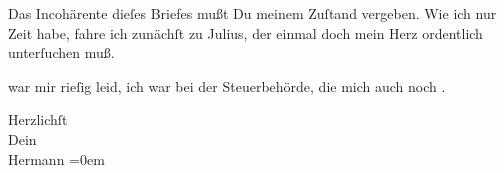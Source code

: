 \pstart
           Das Incohärente dieſes Briefes mußt Du meinem Zuſtand vergeben. Wie ich nur Zeit
               habe, fahre ich zunächſt zu Julius, der einmal
               doch mein Herz ordentlich unterſuchen muß.\pend
           
\pstart
           \label{K_L01282-5v}\label{K_L01282-5} war mir rieſig leid, ich war bei der Steuerbehörde, die mich auch noch
                  \label{K_L01282-6v}\label{K_L01282-6}.\pend
           
\pstart
           Herzlichſt{\\[\baselineskip]}Dein{\\[\baselineskip]}\spacefill\mbox{Hermann}\pend
           \leftskip=0em{}\endnumbering{}  \newcommand{\dateiname}{L01282}\newcommand{\titel}{Hermann Bahr an Arthur Schnitzler, [29. 3. 1903?]}\newcommand{\editorInnen}{Herausgegeben von Martin Anton Müller}
